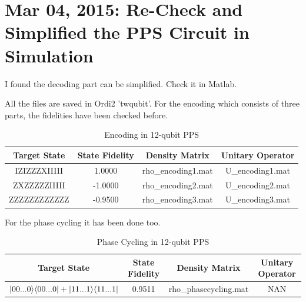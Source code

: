 \clearpage
\section{Mar 04, 2015: Re-Check and Simplified the PPS Circuit in Simulation}

I found the decoding part can be simplified. Check it in Matlab.

All the files are saved in Ordi2 '\dir twqubit\dir'. For the encoding which consists of three parts, the fidelities have been checked before.
\begin{table}[hbtp]
\caption{Encoding in 12-qubit PPS}
\begin{tabular} {c||c|c|c}
  \hline
  Target State & State Fidelity & Density Matrix & Unitary Operator\\
  \hline
  IZIZZZXIIIII & 1.0000 & rho\_encoding1.mat & U\_encoding1.mat\\
  ZXZZZZZIIIII & -1.0000 & rho\_encoding2.mat & U\_encoding2.mat\\
  ZZZZZZZZZZZZ & -0.9500 & rho\_encoding3.mat & U\_encoding3.mat\\
  \hline
\end{tabular}
\end{table}

For the phase cycling it has been done too.
\begin{table}[hbtp]
\caption{Phase Cycling in 12-qubit PPS}
\begin{tabular} {c||c|c|c}
  \hline
  Target State & State Fidelity & Density Matrix & Unitary Operator\\
  \hline
  $|00...0\rangle\langle 00...0| + |11...1\rangle\langle 11...1|$ & 0.9511 & rho\_phasecycling.mat & NAN\\
  \hline
\end{tabular}
\end{table}


